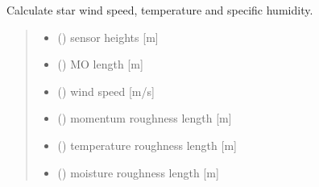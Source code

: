 \documentclass[letterpaper,10pt,english]{sphinxmanual}
\begin{document}
\begin{fulllineitems}

\pysigstartsignatures
{}
\pysigstopsignatures
\sphinxAtStartPar
Calculate star wind speed, temperature and specific humidity.
\begin{quote}\begin{description}
\begin{itemize}
\item {} 
\sphinxAtStartPar
{} () \textendash{} sensor heights {[}m{]}

\item {} 
\sphinxAtStartPar
{} () \textendash{} M\sphinxhyphen{}O length     {[}m{]}

\item {} 
\sphinxAtStartPar
{} () \textendash{} wind speed     {[}m/s{]}

\item {} 
\sphinxAtStartPar
{} () \textendash{} momentum roughness length    {[}m{]}

\item {} 
\sphinxAtStartPar
{} () \textendash{} temperature roughness length {[}m{]}

\item {} 
\sphinxAtStartPar
{} () \textendash{} moisture roughness length    {[}m{]}


\end{itemize}
\end{description}
\end{quote}
\end{fulllineitems}
\end{document}
